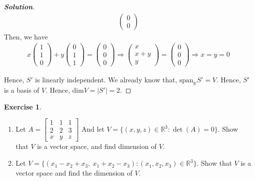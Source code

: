 \documentclass[10pt]{scrartcl}
\theoremstyle{definition}
\newtheorem{exercise}{Exercise}
\newenvironment{solution} {\begin{proof}[\normalfont \textbf{Solution}]} {\end{proof}}
\newcommand{\rn}{\mathbb{R}}
\begin{document}
\begin{solution}
\begin{gather*}
\begin{pmatrix}
                0 \\
                0 
            \end{pmatrix}
        \end{gather*}
        Then, we have
        \begin{gather*}
            x
            \begin{pmatrix}
                1 \\
                1 \\
                0 
            \end{pmatrix}
            +y
            \begin{pmatrix}
                0 \\
                1 \\
                1 
            \end{pmatrix}
            =
            \begin{pmatrix}
                0 \\
                0 \\
                0 
            \end{pmatrix}
            \Rightarrow
            \begin{pmatrix}
                x \\
                x + y \\
                y 
            \end{pmatrix}
            =
            \begin{pmatrix}
                0 \\
                0 \\
                0 
            \end{pmatrix}
            \Rightarrow x = y = 0
        \end{gather*}

        Hence, $S'$ is linearly independent. We already know that, $\text{span}_\rn S' = V$. Hence,
        $S'$ is a basis of $V$. Hence, $\text{dim}V = |S'| = 2$.
    \end{solution}
\begin{exercise}
    $ $
    \begin{enumerate}[label={(\roman*)}]
        \item Let 
                $A = 
                \begin{bmatrix}
                    1 & 1 & 1 \\ 
                    2 & 2 & 3 \\ 
                    x & y & z 
                \end{bmatrix}$
                And let $V = \{(x,y , z) \in \rn^3 : \det(A) = 0\}$. Show that $V$ is a vector space, and find dimension of $V$. 
        \item Let $V = \{(x_1- x_2 + x_3,~x_1 + x_2 - x_3) : (x_1, x_2, x_3) \in \rn^3\}$. Show that $V$ is a vector space and find the dimension of $V$.
    \end{enumerate}
\end{exercise}
\end{document}

